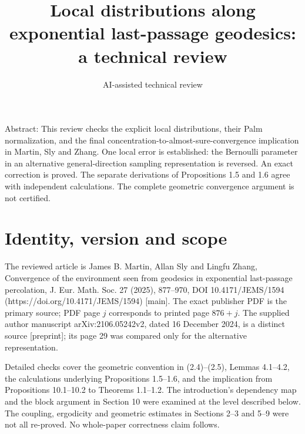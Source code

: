 \documentclass[10pt]{article}
\title{Local distributions along exponential last-passage geodesics: a technical review}
\author{AI-assisted technical review}
\date{}
\begin{document}
\maketitle
Abstract: This review checks the explicit local distributions, their Palm normalization, and the final concentration-to-almost-sure-convergence implication in Martin, Sly and Zhang. One local error is established: the Bernoulli parameter in an alternative general-direction sampling representation is reversed. An exact correction is proved. The separate derivations of Propositions 1.5 and 1.6 agree with independent calculations. The complete geometric convergence argument is not certified.\par
\section*{Identity, version and scope}
The reviewed article is James B. Martin, Allan Sly and Lingfu Zhang, Convergence of the environment seen from geodesics in exponential last-passage percolation, J. Eur. Math. Soc. 27 (2025), 877–970, DOI 10.4171/JEMS/1594 (https://doi.org/10.4171/JEMS/1594) [main]. The exact publisher PDF is the primary source; PDF page \(j\) corresponds to printed page \(876+j\). The supplied author manuscript arXiv:2106.05242v2, dated 16 December 2024, is a distinct source [preprint]; its page 29 was compared only for the alternative representation.\par
Detailed checks cover the geometric convention in (2.4)–(2.5), Lemmas 4.1–4.2, the calculations underlying Propositions 1.5–1.6, and the implication from Propositions 10.1–10.2 to Theorems 1.1–1.2. The introduction’s dependency map and the block argument in Section 10 were examined at the level described below. The coupling, ergodicity and geometric estimates in Sections 2–3 and 5–9 were not all re-proved. No whole-paper correctness claim follows.\par
\end{document}
